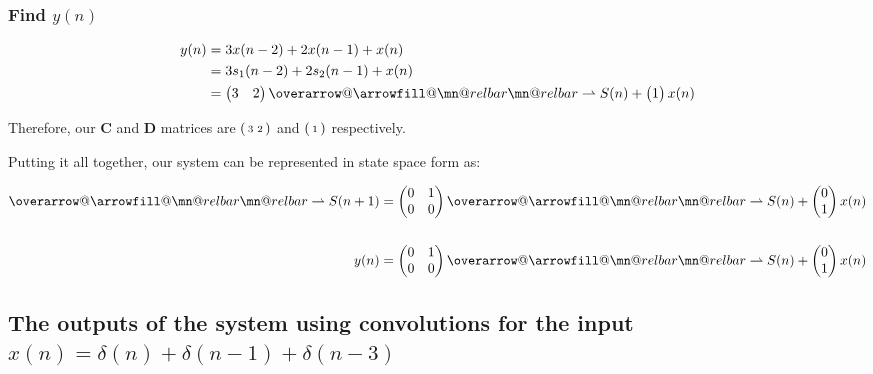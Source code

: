\documentclass{article}
\makeatletter
\renewcommand{\thesubsection}{\thesection.\alph{subsection}}
\renewcommand{\thesubsubsection}{\thesection.\alph{subsection}.\Roman{subsubsection}}
\DeclareRobustCommand{\overrightharpoon}{\mathpalette{\overarrow@\rightharpoonfill@}}
\def\rightharpoonfill@{\arrowfill@\mn@relbar\mn@relbar\rightharpoonup}
\makeatother
\begin{document}
\subsubsection[~\thesubsubsection]{Find $y(n)$}

\begin{align*}
	y(n) &= 3x(n - 2) + 2x(n - 1) + x(n) \\
	&= 3s_1(n - 2) + 2s_2(n - 1) + x(n) \\
	&= \begin{pmatrix} 3 & 2 \end{pmatrix}\overrightharpoon{S(n)} + \begin{pmatrix} 1 \end{pmatrix}x(n)
\end{align*}

Therefore, our $\boldsymbol{C}$ and $\boldsymbol{D}$ matrices are $\begin{psmallmatrix} 3 & 2 \end{psmallmatrix}$ and $\begin{psmallmatrix} 1 \end{psmallmatrix}$ respectively.

Putting it all together, our system can be represented in state space form as:

\begin{align*}
	\overrightharpoon{S(n + 1)} &= \begin{pmatrix} 0 & 1 \\ 0 & 0 \end{pmatrix}\overrightharpoon{S(n)} + \begin{pmatrix} 0 \\ 1 \end{pmatrix}x(n) \\\\
	y(n) &= \begin{pmatrix} 0 & 1 \\ 0 & 0 \end{pmatrix}\overrightharpoon{S(n)} + \begin{pmatrix} 0 \\ 1 \end{pmatrix}x(n)
\end{align*}

\subsection[~\thesubsection]{The outputs of the system using convolutions for the input $x(n) = \delta(n) + \delta(n - 1) + \delta(n - 3)$}
\end{document}
